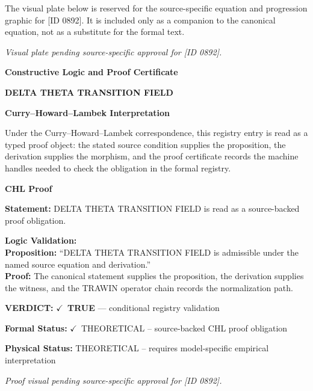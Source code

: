 \begingroup\footnotesize\sloppy
The visual plate below is reserved for the source-specific equation and progression graphic for [ID 0892]. It is included only as a companion to the canonical equation, not as a substitute for the formal text.
\par\endgroup
\begingroup\footnotesize\itshape
Visual plate pending source-specific approval for [ID 0892].
\par\endgroup

\clearpage
\begingroup\tzpsupportsetup
\noindent\textbf{\fontsize{10.8pt}{12.8pt}\selectfont [ID 0892] Constructive Logic and Proof Certificate}\par
\noindent\textbf{\fontsize{10pt}{12pt}\selectfont DELTA THETA TRANSITION FIELD}\par
\vspace{0.45em}
\begingroup
\footnotesize
\setlength{\parskip}{0.22em}
\setlength{\parindent}{0pt}
\noindent\textbf{Curry--Howard--Lambek Interpretation}\par
Under the Curry--Howard--Lambek correspondence, this registry entry is read as a typed proof
object: the stated source condition supplies the proposition, the derivation supplies the
morphism, and the proof certificate records the machine handles needed to check the obligation
in the formal registry.

\vspace{0.45em}
\noindent\textbf{CHL Proof}\par
\textbf{Statement:} DELTA THETA TRANSITION FIELD is read as a source-backed proof obligation.

\textbf{Logic Validation:}\\
\textbf{Proposition:} ``DELTA THETA TRANSITION FIELD is admissible under the named source equation and derivation.''\\
\textbf{Proof:} The canonical statement supplies the proposition, the derivation supplies the witness, and the TRAWIN operator chain records the normalization path.

\textbf{VERDICT:} \ensuremath{\checkmark}\ \textbf{TRUE} --- conditional registry validation

\textbf{Formal Status:} \ensuremath{\checkmark}\ THEORETICAL -- source-backed CHL proof obligation

\textbf{Physical Status:} THEORETICAL -- requires model-specific empirical interpretation
\par\vspace{0.45em}
\par
\vfill
\begingroup\footnotesize\itshape
Proof visual pending source-specific approval for [ID 0892].
\par\endgroup
\vfill
\endgroup
\endgroup
